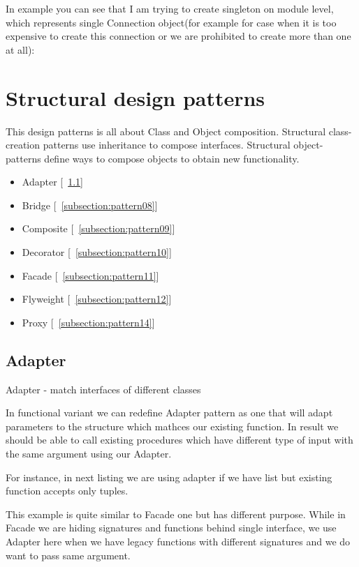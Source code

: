 In example you can see that I am trying to create singleton on module level, which represents single Connection object(for example for case when it is too expensive to create this connection or we are prohibited to create more than one at all):

\section{Structural design patterns}
This design patterns is all about Class and Object composition. Structural class-creation patterns use inheritance to compose interfaces. Structural object-patterns define ways to compose objects to obtain new functionality.
\begin{itemize}
	\item Adapter [~\ref{subsection:pattern07}]
	\item Bridge [~\ref{subsection:pattern08}]
	\item Composite [~\ref{subsection:pattern09}]
	\item Decorator [~\ref{subsection:pattern10}]
	\item Facade [~\ref{subsection:pattern11}]
	\item Flyweight [~\ref{subsection:pattern12}]
	\item Proxy [~\ref{subsection:pattern14}]
\end{itemize}

\subsection{Adapter} \label{subsection:pattern07}
Adapter - match interfaces of different classes

In functional variant we can redefine Adapter pattern as one that will adapt parameters to the structure which mathces our existing function. In result we should be able to call existing procedures which have different type of input with the same argument using our Adapter.

For instance, in next listing we are using adapter if we have list but existing function accepts only tuples.

This example is quite similar to Facade one but has different purpose. While in Facade we are hiding signatures and functions behind single interface, we use Adapter here when we have legacy functions with different signatures and we do want to pass same argument.

